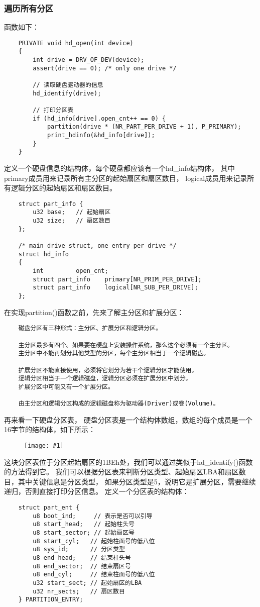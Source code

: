\documentclass[a4paper,left=2.5cm,right=2.5cm,11pt]{article}
\newcommand{\fic}[1]{\begin{figure}[H]
		\center
		\texttt{[image: \#1]}
	\end{figure}}
\begin{document}
\subsubsection{遍历所有分区}
	函数如下：
	\begin{lstlisting}
	PRIVATE void hd_open(int device)
	{
		int drive = DRV_OF_DEV(device);
		assert(drive == 0);	/* only one drive */

		// 读取硬盘驱动器的信息
		hd_identify(drive);

		// 打印分区表
		if (hd_info[drive].open_cnt++ == 0) {
			partition(drive * (NR_PART_PER_DRIVE + 1), P_PRIMARY);
			print_hdinfo(&hd_info[drive]);
		}
	}
	\end{lstlisting}

	定义一个硬盘信息的结构体，每个硬盘都应该有一个hd\_info结构体，
	其中primary成员用来记录所有主分区的起始扇区和扇区数目，
	logical成员用来记录所有逻辑分区的起始扇区和扇区数目。
	\begin{lstlisting}
	struct part_info {
		u32	base;	// 起始扇区
		u32	size;   // 扇区数目
	};

	/* main drive struct, one entry per drive */
	struct hd_info
	{
		int			open_cnt;
		struct part_info	primary[NR_PRIM_PER_DRIVE];
		struct part_info	logical[NR_SUB_PER_DRIVE];
	};
	\end{lstlisting}

	在实现partition()函数之前，先来了解主分区和扩展分区：
	\begin{lstlisting}
	磁盘分区有三种形式：主分区、扩展分区和逻辑分区。

	主分区最多有四个。如果要在硬盘上安装操作系统，那么这个必须有一个主分区。
	主分区中不能再划分其他类型的分区，每个主分区相当于一个逻辑磁盘。

	扩展分区不能直接使用，必须将它划分为若干个逻辑分区才能使用。
	逻辑分区相当于一个逻辑磁盘，逻辑分区必须在扩展分区中划分。
	扩展分区中可能又有一个扩展分区。

	由主分区和逻辑分区构成的逻辑磁盘称为驱动器(Driver)或卷(Volume)。
	\end{lstlisting}
	
	再来看一下硬盘分区表，
	硬盘分区表是一个结构体数组，数组的每个成员是一个16字节的结构体，如下所示：
	\fic{4.png}

	这块分区表位于分区起始扇区的1BEh处，我们可以通过类似于hd\_identify()函数的方法得到它。
	我们可以根据分区表来判断分区类型、起始扇区LBA和扇区数目，其中关键信息是分区类型，
	如果分区类型是5，说明它是扩展分区，需要继续递归，否则直接打印分区信息。
	定义一个分区表的结构体：
	\begin{lstlisting}
	struct part_ent {
		u8 boot_ind;	 // 表示是否可以引导
		u8 start_head;	 // 起始柱头号
		u8 start_sector; // 起始扇区号
		u8 start_cyl;	// 起始柱面号的低八位
		u8 sys_id;	    // 分区类型
		u8 end_head;	// 结束柱头号
		u8 end_sector;	// 结束扇区号
		u8 end_cyl;		// 结束柱面号的低八位
		u32 start_sect;	// 起始扇区的LBA
		u32 nr_sects; 	// 扇区数目
	} PARTITION_ENTRY;
	\end{lstlisting}
\end{document}
